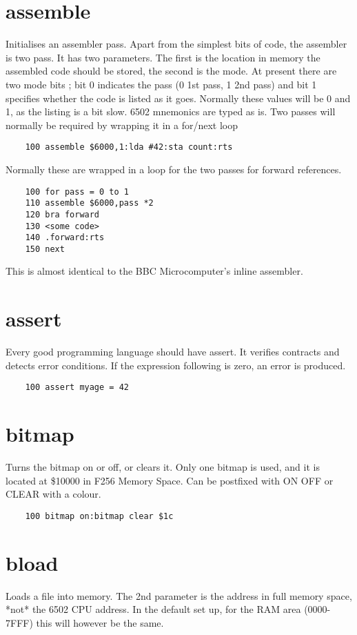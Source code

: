 \section*{assemble}
Initialises an assembler pass. Apart from the simplest bits of code, the assembler is two pass. It has two parameters. The first is the location in memory the assembled code should be stored, the second is the mode. At present there are two mode bits ; bit 0 indicates the pass (0 1st pass, 1 2nd pass) and bit 1 specifies whether the code is listed as it goes. Normally these values will be 0 and 1, as the listing is a bit slow. 6502 mnemonics are typed as is. Two passes will normally be required by wrapping it in a for/next loop
\example{}
\begin{verbatim}
	100 assemble $6000,1:lda #42:sta count:rts
\end{verbatim}
Normally these are wrapped in a loop for the two passes for forward references.
\example{}
\begin{verbatim}
	100 for pass = 0 to 1
	110 assemble $6000,pass *2
	120 bra forward
	130 <some code>
	140 .forward:rts
	150 next
\end{verbatim}
This is almost identical to the BBC Microcomputer’s inline assembler.

\section*{assert}
Every good programming language should have assert. It verifies contracts and detects error conditions. If the expression following is zero, an error is produced.
\example{}
\begin{verbatim}
	100 assert myage = 42
\end{verbatim}

\section*{bitmap}
Turns the bitmap on or off, or clears it. Only one bitmap is used, and it is located at \$10000 in F256 Memory Space. Can be postfixed with ON OFF or CLEAR with a colour.
\example{}
\begin{verbatim}
	100 bitmap on:bitmap clear $1c
\end{verbatim}

\section*{bload}
Loads a file into memory. The 2nd parameter is the address in full memory space, *not* the 6502 CPU address. In the default set up, for the RAM area (0000-7FFF) this will however be the same.

